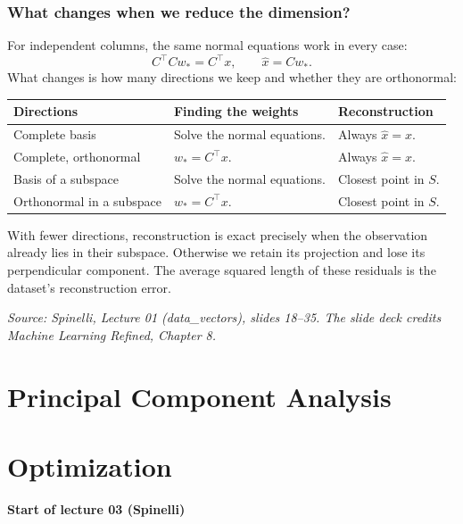 \documentclass[a4paper,12pt,oneside]{report}
\begin{document}
\subsection{What changes when we reduce the dimension?}

For independent columns, the same normal equations work in every case:
\[
  C^\top Cw_*=C^\top x,\qquad \hat{x}=Cw_*.
\]
What changes is how many directions we keep and whether they are
orthonormal:
\begin{center}
\begin{tabularx}{\linewidth}{@{}lXX@{}}
\toprule
\textbf{Directions} & \textbf{Finding the weights} & \textbf{Reconstruction} \\
\midrule
Complete basis & Solve the normal equations. & Always $\hat{x}=x$. \\
Complete, orthonormal & $w_*=C^\top x$. & Always $\hat{x}=x$. \\
Basis of a subspace & Solve the normal equations. & Closest point in $S$. \\
Orthonormal in a subspace & $w_*=C^\top x$. & Closest point in $S$. \\
\bottomrule
\end{tabularx}
\end{center}

With fewer directions, reconstruction is exact precisely when the
observation already lies in their subspace. Otherwise we retain its
projection and lose its perpendicular component. The average squared
length of these residuals is the dataset's reconstruction error.

\medskip
{\small\textit{Source: Spinelli, Lecture 01 (data\_vectors), slides
18--35. The slide deck credits Machine Learning Refined, Chapter 8.}}

\chapter{Principal Component Analysis}\label{chap:pca}


\chapter{Optimization}\label{chap:optimization}

\begin{tcolorbox}[colback=yellow!20,colframe=yellow!60!black,
  boxrule=0.4pt,arc=1mm,left=5pt,right=5pt,top=3pt,bottom=3pt,
  before skip=0pt,after skip=0pt]
\small\textbf{Start of lecture 03 (Spinelli)}
\end{tcolorbox}
\end{document}
